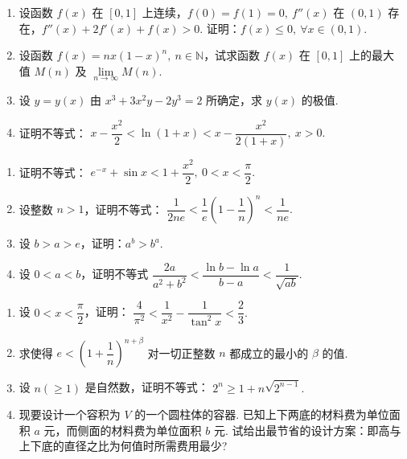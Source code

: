 \newpage

\begin{enumerate}[label=\textbf{\arabic*.}, itemsep=6cm, resume]
    \item 设函数 $f(x)$ 在 $[0,1]$ 上连续，$f(0)=f(1)=0,\ f''(x)$ 在 $(0,1)$ 存在，$f''(x)+2f'(x)+f(x)>0$. 证明：$f(x)\le0,\ \forall x\in(0,1)$.
    
    \item 设函数 $f(x)=nx(1-x)^n,\ n\in\mathbb{N}$，试求函数 $f(x)$ 在 $[0,1]$ 上的最大值 $M(n)$ 及 $\lim\limits_{n\to\infty}M(n)$.
    
    \item 设 $y=y(x)$ 由 $x^3+3x^2y-2y^3=2$ 所确定，求 $y(x)$ 的极值.
    
    \item 证明不等式：
    $ x-\dfrac{x^2}{2}<\ln(1+x)<x-\dfrac{x^2}{2(1+x)},\ x>0. $
\end{enumerate}

\newpage

\begin{enumerate}[label=\textbf{\arabic*.}, itemsep=6cm, resume]
    \item 证明不等式：
    $ e^{-x}+\sin x<1+\dfrac{x^2}{2},\ 0<x<\dfrac{\pi}{2}. $
    
    \item 设整数 $n>1$，证明不等式：
    $ \dfrac{1}{2ne}<\dfrac{1}{e}\left(1-\dfrac{1}{n}\right)^n<\dfrac{1}{ne}. $
    
    \item 设 $b>a>e$，证明：$a^b>b^a$.
    
    \item 设 $0<a<b$，证明不等式
    $ \dfrac{2a}{a^2+b^2}<\dfrac{\ln b-\ln a}{b-a}<\dfrac{1}{\sqrt{ab}}. $
\end{enumerate}

\newpage

\begin{enumerate}[label=\textbf{\arabic*.}, itemsep=6cm, resume]
    \item 设 $0<x<\dfrac{\pi}{2}$，证明：
    $ \dfrac{4}{\pi^2}<\dfrac{1}{x^2}-\dfrac{1}{\tan^2x}<\dfrac{2}{3}. $
    
    \item 求使得 $e<\left(1+\dfrac{1}{n}\right)^{n+\beta}$ 对一切正整数 $n$ 都成立的最小的 $\beta$ 的值.
    
    \item 设 $n(\ge1)$ 是自然数，证明不等式：
    $ 2^n\ge1+n\sqrt{2^{n-1}}. $
    
    \item 现要设计一个容积为 $V$ 的一个圆柱体的容器. 已知上下两底的材料费为单位面积 $a$ 元，而侧面的材料费为单位面积 $b$ 元. 试给出最节省的设计方案：即高与上下底的直径之比为何值时所需费用最少?
\end{enumerate}

